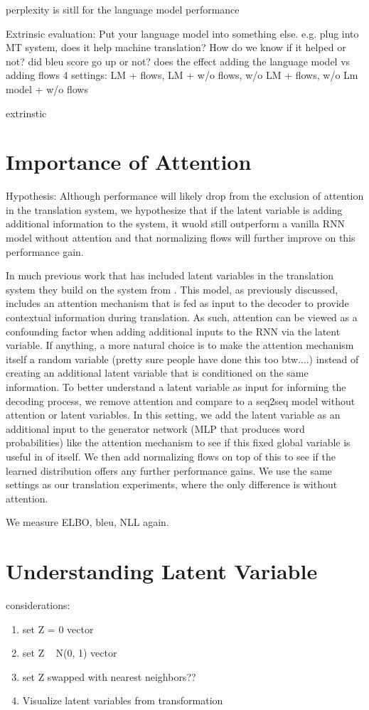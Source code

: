 perplexity is sitll for the language model performance

Extrinsic evaluation: Put your language model into something else. e.g. plug into MT system, does it help machine translation?
How do we know if it helped or not? did bleu score go up or not? 
does the effect adding the language model vs adding flows
4 settings: LM + flows, LM + w/o flows, w/o LM + flows, w/o Lm model + w/o flows


extrinstic
\section{Importance of Attention}

Hypothesis:  Although performance will likely drop from the exclusion of attention in the translation system, we hypothesize that if the latent variable is adding additional information to the system, it wuold still outperform a vanilla RNN model without attention and that normalizing flows will further improve on this performance gain.

In much previous work that has included latent variables in the translation system they build on the system from \cite{bahndanau et. al.} . This model, as previously discussed, includes an attention mechanism that is fed as input to the decoder to provide contextual information during translation. As such, attention can be viewed as a confounding factor when adding additional inputs to the RNN via the latent variable. If anything, a more natural choice is to make the attention mechanism itself a random variable (pretty sure people have done this too btw....) instead of creating an additional latent variable that is conditioned on the same information. To better understand a latent variable as input for informing the decoding process, we remove attention and compare to a seq2seq model without attention or latent variables. In this setting, we add the latent variable as an additional input to the generator network (MLP that produces word probabilities) like the attention mechanism to see if this fixed global variable is useful in of itself. We then add normalizing flows on top of this to see if the learned distribution offers any further performance gains. We use the same settings as our translation experiments, where the only difference is without attention.

We measure ELBO, bleu, NLL again.



\section{Understanding Latent Variable}

considerations:
\begin{enumerate}
	\item set Z = 0 vector
	\item set Z ~ N(0, 1) vector
	\item set Z swapped with nearest neighbors??
	\item Visualize latent variables from transformation
\end{enumerate}